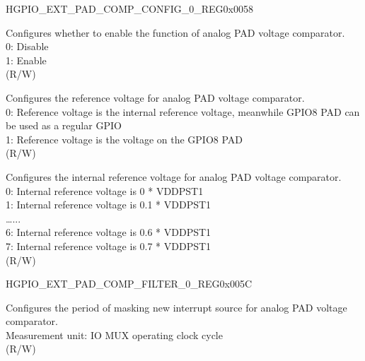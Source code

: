 \begin{register}{H}{GPIO\_EXT\_PAD\_COMP\_CONFIG\_0\_REG}{0x0058}\label{regdesc:GPIOEXTPADCOMPCONFIG0REG}
%
%
%
%
\regnewline%
\begin{regdesc}\begin{reglist}
\label{fielddesc:GPIOEXTXPDCOMP0}\item [GPIO\_EXT\_XPD\_COMP\_0] Configures whether to enable the function of analog PAD voltage comparator.\\
0: Disable\\
1: Enable\\ (R/W)
\label{fielddesc:GPIOEXTMODECOMP0}\item [GPIO\_EXT\_MODE\_COMP\_0] Configures the reference voltage for analog PAD voltage comparator. \\
0: Reference voltage is the internal reference voltage, meanwhile GPIO8 PAD can be used as a regular GPIO\\
1: Reference voltage is the voltage on the GPIO8 PAD\\ (R/W)
\label{fielddesc:GPIOEXTDREFCOMP0}\item [GPIO\_EXT\_DREF\_COMP\_0] Configures the internal reference voltage for analog PAD voltage comparator. \\
0: Internal reference voltage is 0 * VDDPST1\\
1: Internal reference voltage is 0.1 * VDDPST1\\
…...\\
6: Internal reference voltage is 0.6 * VDDPST1\\
7: Internal reference voltage is 0.7 * VDDPST1\\ (R/W)
\end{reglist}\end{regdesc}
\end{register}


\begin{register}{H}{GPIO\_EXT\_PAD\_COMP\_FILTER\_0\_REG}{0x005C}\label{regdesc:GPIOEXTPADCOMPFILTER0REG}
%
\regnewline%
\begin{regdesc}\begin{reglist}
\label{fielddesc:GPIOEXTZERODETFILTERCNT0}\item [GPIO\_EXT\_ZERO\_DET\_FILTER\_CNT\_0] Configures the period of masking new interrupt source for analog PAD voltage comparator.\\
Measurement unit: IO MUX operating clock cycle\\ (R/W)
\end{reglist}\end{regdesc}
\end{register}


